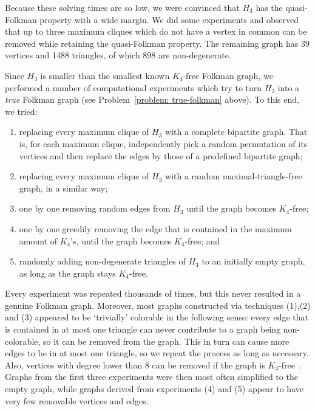 \documentclass[A4paper,reqno,oneside,12pt]{amsart}
\theoremstyle{plain}
\theoremstyle{definition}
\begin{document}
Because these solving times are so low, we were convinced that $H_3$ has the quasi-Folkman property with a wide margin.
We did some experiments and observed that up to three maximum cliques which do not have a vertex in common can be removed while retaining the quasi-Folkman property.
The remaining graph has 39 vertices and 1488 triangles, of which 898 are non-degenerate.

Since $H_3$ is smaller than the smallest known $K_4$-free Folkman graph, we performed a number of computational experiments which try to turn $H_3$ into a \textit{true} Folkman graph (see Problem~\ref{problem: true-folkman} above).
To this end, we tried:
\begin{enumerate}
    \item replacing every maximum clique of $H_3$ with a complete bipartite graph. That is, for each maximum clique, independently pick a random permutation of its vertices and then replace the edges by those of a predefined bipartite graph;
    \item replacing every maximum clique of $H_3$ with a random maximal-triangle-free graph, in a similar way;
    \item one by one removing random edges from $H_3$ until the graph becomes $K_4$-free;
    \item one by one greedily removing the edge that is contained in the maximum amount of $K_4$'s, until the graph becomes $K_4$-free; and
    \item randomly adding non-degenerate triangles of $H_3$ to an initially empty graph, as long as the graph stays $K_4$-free.
\end{enumerate}
Every experiment was repeated thousands of times, but this never resulted in a genuine Folkman graph. Moreover, most graphs constructed via techniques (1),(2) and (3) appeared to be `trivially' colorable in the following sense: every edge that is contained in at most one triangle can never contribute to a graph being non-colorable, so it can be removed from the graph.  This in turn can cause more edges to be in at most one triangle, so we repeat the process as long as necessary.  Also, vertices with degree lower than 8 can be removed if the graph is $K_4$-free~\cite{BN20}.  Graphs from the first three experiments were then most often simplified to the empty graph, while graphs derived from experiments (4) and (5) appear to have very few removable vertices and edges.
\end{document}
